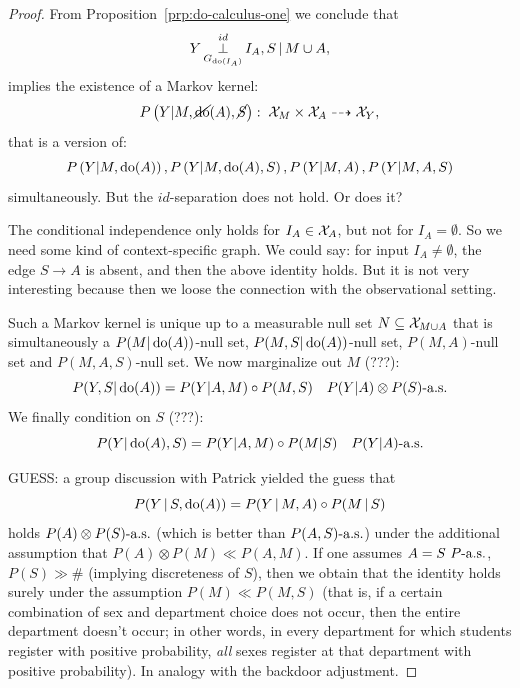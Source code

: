 \begin{proof}
    From Proposition~\ref{prp:do-calculus-one} we conclude that 
    \[ Y \operatorname*{\perp}^{id}_{G_{\operatorname{do}(I_A)}} I_A,S \operatorname*{|} M \cup A,   \]
    implies the existence of a Markov kernel: 
    \[P\left ( Y|M,\cancel{\operatorname{do}}(A),\cancel{S}\right ):\; \mathcal{X}_M \times \mathcal{X}_A \dashrightarrow \mathcal{X}_Y,\] 
    that is a version of:  
    \[ P\left ( Y|M,\operatorname{do}(A)\right ), P\left ( Y|M,\operatorname{do}(A),S\right ), P\left ( Y|M,A\right ), P\left ( Y|M,A,S\right )\]
    simultaneously. 
    But the $id$-separation does not hold.
    Or does it?

    The conditional independence only holds for $I_{A} \in \mathcal{X}_A$, but not for $I_A = \emptyset$.
    So we need some kind of context-specific graph.
    We could say: for input $I_A \ne \emptyset$, the edge $S \to A$ is absent, and then the above
    identity holds. 
    But it is not very interesting because then we loose the connection with the observational setting.

    Such a Markov kernel is unique up to a measurable null set $N \subseteq \mathcal{X}_{M \cup A}$ that is
    simultaneously a $P(M|\operatorname{do}(A))$-null set, $P(M,S|\operatorname{do}(A))$-null set, $P(M,A)$-null set and $P(M,A,S)$-null set.
    We now marginalize out $M$ (???):
      \[ P(Y,S | \operatorname{do}(A)) = P(Y|A,M) \circ P(M,S) \quad P(Y|A)\otimes P(S)\text{-a.s.}\]
    We finally condition on $S$ (???):
      \[ P(Y | \operatorname{do}(A),S) = P(Y|A,M) \circ P(M|S) \quad P(Y|A)\text{-a.s.} \]

GUESS: a group discussion with Patrick yielded the guess that
 $$P(Y \operatorname*{|} S, \operatorname{do}(A)) = P(Y \operatorname*{|} M, A) \circ P(M \operatorname*{|} S)$$
holds $P(A) \otimes P(S)\text{-a.s.}$ (which is better than $P(A,S)\text{-a.s.}$) under the additional assumption that $P(A) \otimes P(M) \ll P(A,M)$.
If one assumes $A=S\ P\text{-a.s.}$, $P(S) \gg \#$ (implying discreteness of $S$), then we obtain that the identity holds surely under the assumption $P(M) \ll P(M,S)$ (that is, if a certain
combination of sex and department choice does not occur, then the entire department doesn't occur; in other words, in every department for which students register with positive
probability, \emph{all} sexes register at that department with positive probability).
In analogy with the backdoor adjustment.


\end{proof}
